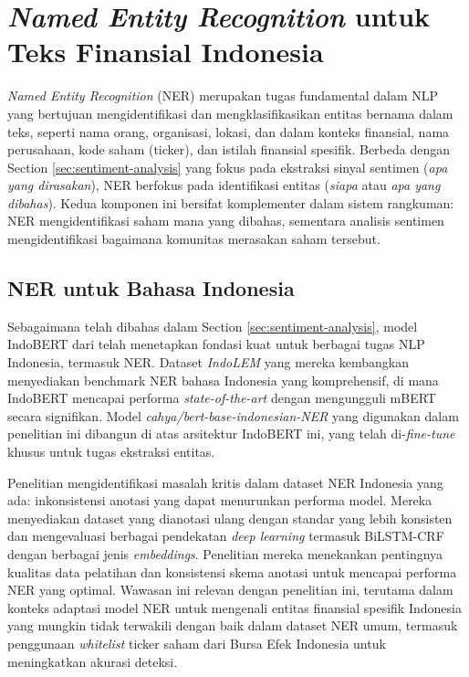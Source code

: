 \section{\textit{Named Entity Recognition} untuk Teks Finansial Indonesia}
\label{sec:ner}

\textit{Named Entity Recognition} (NER) merupakan tugas fundamental dalam NLP yang bertujuan mengidentifikasi dan mengklasifikasikan entitas bernama dalam teks, seperti nama orang, organisasi, lokasi, dan dalam konteks finansial, nama perusahaan, kode saham (ticker), dan istilah finansial spesifik. Berbeda dengan Section \ref{sec:sentiment-analysis} yang fokus pada ekstraksi sinyal sentimen (\textit{apa yang dirasakan}), NER berfokus pada identifikasi entitas (\textit{siapa} atau \textit{apa yang dibahas}). Kedua komponen ini bersifat komplementer dalam sistem rangkuman: NER mengidentifikasi saham mana yang dibahas, sementara analisis sentimen mengidentifikasi bagaimana komunitas merasakan saham tersebut.

\subsection{NER untuk Bahasa Indonesia}

Sebagaimana telah dibahas dalam Section \ref{sec:sentiment-analysis}, model IndoBERT dari \textcite{koto2020} telah menetapkan fondasi kuat untuk berbagai tugas NLP Indonesia, termasuk NER. Dataset \textit{IndoLEM} yang mereka kembangkan menyediakan benchmark NER bahasa Indonesia yang komprehensif, di mana IndoBERT mencapai performa \textit{state-of-the-art} dengan mengungguli mBERT secara signifikan. Model \textit{cahya/bert-base-indonesian-NER} yang digunakan dalam penelitian ini dibangun di atas arsitektur IndoBERT ini, yang telah di-\textit{fine-tune} khusus untuk tugas ekstraksi entitas.

Penelitian \textcite{khairunnisa2020} mengidentifikasi masalah kritis dalam dataset NER Indonesia yang ada: inkonsistensi anotasi yang dapat menurunkan performa model. Mereka menyediakan dataset yang dianotasi ulang dengan standar yang lebih konsisten dan mengevaluasi berbagai pendekatan \textit{deep learning} termasuk BiLSTM-CRF dengan berbagai jenis \textit{embeddings}. Penelitian mereka menekankan pentingnya kualitas data pelatihan dan konsistensi skema anotasi untuk mencapai performa NER yang optimal. Wawasan ini relevan dengan penelitian ini, terutama dalam konteks adaptasi model NER untuk mengenali entitas finansial spesifik Indonesia yang mungkin tidak terwakili dengan baik dalam dataset NER umum, termasuk penggunaan \textit{whitelist} ticker saham dari Bursa Efek Indonesia untuk meningkatkan akurasi deteksi.

